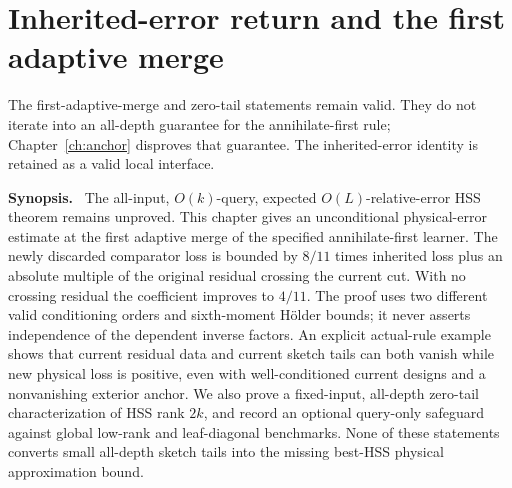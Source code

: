 \documentclass[11pt,oneside,openany,a4paper]{book}
\numberwithin{equation}{chapter}
\theoremstyle{definition}
\theoremstyle{remark}
\newenvironment{chaptersynopsis}{\begingroup\small\textbf{Synopsis.}\ }{\par\endgroup\medskip}
\newcommand{\R}{\mathbb R}\newcommand{\E}{\mathbb E}\newcommand{\Prb}{\mathbb P}\newcommand{\PP}{\mathbb P}
\newcommand{\F}[1]{\left\lVert#1\right\rVert_F}
\newcommand{\op}[1]{\left\lVert#1\right\rVert_{\rm op}}
\DeclareMathOperator{\tr}{tr}\DeclareMathOperator{\rank}{rank}
\DeclareMathOperator{\diag}{blockdiag}\DeclareMathOperator{\range}{range}
\DeclareMathOperator{\ran}{range}\DeclareMathOperator{\OPT}{OPT}
\newcommand{\HH}{\mathcal H}\newcommand{\SSS}{\mathcal S}
\begin{document}
\endgroup

\begingroup
\let\E\relax
\newcommand{\E}{\mathbb E}
\let\PP\relax
\newcommand{\PP}{\mathbb P}
\let\R\relax
\newcommand{\R}{\mathbb R}
\let\Id\relax
\newcommand{\Id}{I}
\let\HH\relax
\newcommand{\HH}{\mathcal H}
\let\SSS\relax
\newcommand{\SSS}{\mathcal S}
\let\F\relax
\newcommand{\F}[1]{\left\|#1\right\|_F}
\let\op\relax
\newcommand{\op}[1]{\left\|#1\right\|_{\mathrm{op}}}
\let\ran\relax
\newcommand{\ran}{\operatorname{range}}
\let\rank\relax
\newcommand{\rank}{\operatorname{rank}}
\let\diag\relax
\newcommand{\diag}{\operatorname{diag}}
\let\tr\relax
\newcommand{\tr}{\operatorname{tr}}
\let\dist\relax
\newcommand{\dist}{\operatorname{dist}}
\let\OPT\relax
\newcommand{\OPT}{\operatorname{OPT}}
\chapter{Inherited-error return and the first adaptive merge}\label{ch:return}
\begin{scopebox}
The first-adaptive-merge and zero-tail statements remain valid. They do not iterate into an all-depth guarantee for the annihilate-first rule; Chapter~\ref{ch:anchor} disproves that guarantee. The inherited-error identity is retained as a valid local interface.
\end{scopebox}
\begin{chaptersynopsis}
The all-input, $O(k)$-query, expected $O(L)$-relative-error HSS theorem remains unproved. This chapter gives an unconditional physical-error estimate at the first adaptive merge of the specified annihilate-first learner. The newly discarded comparator loss is bounded by $8/11$ times inherited loss plus an absolute multiple of the original residual crossing the current cut. With no crossing residual the coefficient improves to $4/11$. The proof uses two different valid conditioning orders and sixth-moment H\"older bounds; it never asserts independence of the dependent inverse factors. An explicit actual-rule example shows that current residual data and current sketch tails can both vanish while new physical loss is positive, even with well-conditioned current designs and a nonvanishing exterior anchor. We also prove a fixed-input, all-depth zero-tail characterization of HSS rank $2k$, and record an optional query-only safeguard against global low-rank and leaf-diagonal benchmarks. None of these statements converts small all-depth sketch tails into the missing best-HSS physical approximation bound.
\end{chaptersynopsis}
\end{document}
